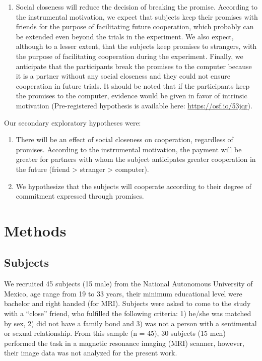 \documentclass[smallextended]{svjour3}       %
\providecommand{\tightlist}{%
  \setlength{\itemsep}{0pt}\setlength{\parskip}{0pt}}
\begin{document}
\begin{enumerate}
\def\labelenumi{\arabic{enumi}.}
\tightlist
\item
  Social closeness will reduce the decision of breaking the promise.
  According to the instrumental motivation, we expect that subjects keep
  their promises with friends for the purpose of facilitating future
  cooperation, which probably can be extended even beyond the trials in
  the experiment. We also expect, although to a lesser extent, that the
  subjects keep promises to strangers, with the purpose of facilitating
  cooperation during the experiment. Finally, we anticipate that the
  participants break the promises to the computer because it is a
  partner without any social closeness and they could not ensure
  cooperation in future trials. It should be noted that if the
  participants keep the promises to the computer, evidence would be
  given in favor of intrinsic motivation (Pre-registered hypothesis is available
here: \url{https://osf.io/53jqr}).
\end{enumerate}

Our secondary exploratory hypotheses were:

\begin{enumerate}
\def\labelenumi{\arabic{enumi}.}
\setcounter{enumi}{1}
\item
  There will be an effect of social closeness on cooperation, regardless
  of promises. According to the instrumental motivation, the payment
  will be greater for partners with whom the subject anticipates greater
  cooperation in the future (friend \textgreater{} stranger
  \textgreater{} computer).
\item
  We hypothesize that the subjects will cooperate according to their
  degree of commitment expressed through promises.
\end{enumerate}

\hypertarget{methods}{%
\section{Methods}\label{methods}}

\hypertarget{subjects}{%
\subsection{Subjects}\label{subjects}}

We recruited 45 subjects (15 male) from the National Autonomous
University of Mexico, age range from 19 to 33 years, their minimum
educational level were bachelor and right handed (for MRI). Subjects
were asked to come to the study with a ``close'' friend, who fulfilled
the following criteria: 1) he/she was matched by sex, 2) did not have a
family bond and 3) was not a person with a sentimental or sexual
relationship. From this sample (n = 45), 30 subjects (15 men) performed
the task in a magnetic resonance imaging (MRI) scanner, however, their
image data was not analyzed for the present work.
\end{document}
